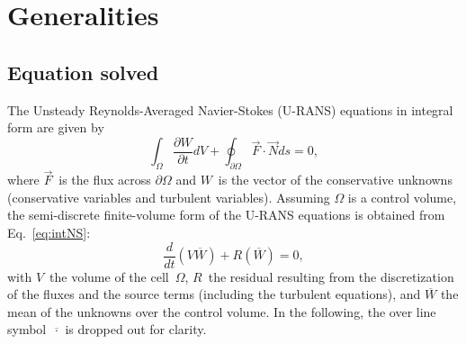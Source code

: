 \chapter{Generalities}
\label{generalities}


\section{Equation solved} %
\label{sec:equation_solved}

The Unsteady Reynolds-Averaged Navier-Stokes (U-RANS) equations in
integral form are given by
\begin{equation}
   \int_\Omega \frac{\partial W}{\partial t} dV + \oint_{\partial
     \Omega} \overrightarrow{F} \cdot \overrightarrow{N} ds = 0,
   \label{eq:intNS}
\end{equation} 
where $\overrightarrow{F}$~is the flux across $\partial \Omega$ and
$W$~is the vector of the conservative unknowns (conservative variables
and turbulent variables).  Assuming $\Omega$ is a
control volume, the semi-discrete finite-volume form of the
U-RANS equations is obtained from Eq.~\eqref{eq:intNS}:
\begin{equation}
   \frac{d}{dt} \left(V  \overline{W}\right) + R \left( \overline{W}
   \right) = 0,
   \label{eq:semiDiscNS}
\end{equation} 
with $V$~the volume of the cell~$\Omega$, $R$~the residual resulting
from the discretization of the fluxes and the source terms (including
the turbulent equations), and $\overline{W}$ the mean of the
unknowns over the control volume.  In the following, the over line
symbol~$\overline{\cdot}$ is dropped out for clarity.


